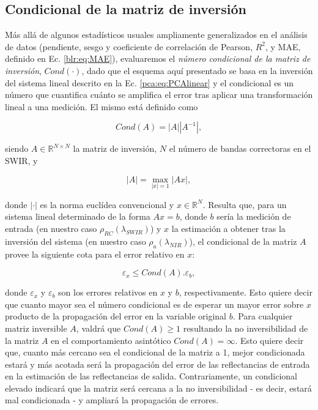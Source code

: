     \subsection{Condicional de la matriz de inversión}
    \label{pca:s:condicional}

        Más allá de algunos estadísticos usuales ampliamente generalizados en el análisis de datos (pendiente, sesgo y coeficiente de correlación de Pearson, $R^{2}$, y MAE, definido en Ec. \ref{blr:eq:MAE}), evaluaremos el \textit{número condicional de la matriz de inversión}, $Cond(\cdot)$, dado que el esquema aquí presentado se basa en la inversión del sistema lineal descrito en la Ec. \ref{pca:eq:PCAlinear} y el condicional es un número que cuantifica cuánto se amplifica el error tras aplicar una transformación lineal a una medición. El mismo está definido como
    
        \begin{equation}
            Cond(A) = |A||A^{-1}|,
            \label{pca:eq:condicional}
        \end{equation}
    
        \noindent siendo $A \in \mathbb{R}^{N\times N}$ la matriz de inversión, $N$ el número de bandas correctoras en el SWIR, y
    
        \begin{equation}
            |A| = \max_{|x|=1}|Ax|,
            \label{pca:eq:condicionalNorma}
        \end{equation}
    
        \noindent donde $|\cdot|$ es la norma euclídea convencional y $x \in \mathbb{R}^{N}$. Resulta que, para un sistema lineal determinado de la forma $Ax=b$, donde $b$ sería la medición de entrada (en nuestro caso $\rho_{RC}(\lambda_{SWIR})$) y $x$ la estimación a obtener tras la inversión del sistema (en nuestro caso $\rho_{a}(\lambda_{NIR})$), el condicional de la matriz $A$ provee la siguiente cota para el error relativo en $x$:
        
        \begin{equation}
            \varepsilon_{x} \leq Cond(A).\varepsilon_{b},
            \label{pca:eq:condicionalProp0}
        \end{equation}

        \noindent donde $\varepsilon_{x}$ y $\varepsilon_{b}$ son los errores relativos en $x$ y $b$, respectivamente. Esto quiere decir que cuanto mayor sea el número condicional es de esperar un mayor error sobre $x$ producto de la propagación del error en la variable original $b$. Para cualquier matriz inversible $A$, valdrá que $Cond(A) \geq 1$ resultando la no inversibilidad de la matriz $A$ en el comportamiento asintótico $Cond(A) = \infty$. Esto quiere decir que, cuanto más cercano sea el condicional de la matriz a 1, mejor condicionada estará y más acotada será la propagación del error de las reflectancias de entrada en la estimación de las reflectancias de salida. Contrariamente, un condicional elevado indicará que la matriz será cercana a la no inversibilidad - es decir, estará mal condicionada - y ampliará la propagación de errores.

